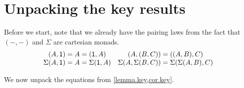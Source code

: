 \documentclass[11pt, one side, article]{memoir}
\theoremstyle{definition}
\theoremstyle{plain}
\newcommand{\Cat}[1]{\mathbf{#1}}%
\newcommand{\Fun}[1]{\mathit{#1}}%
\newcommand{\poly}{\Cat{Poly}}
\newcommand{\polycart}{\poly^{\Cat{Cart}}}
\newcommand{\0}{\textsf{0}}
\newcommand{\1}{\tn{\textsf{1}}}
\newcommand{\tri}{\mathbin{\triangleleft}}
\newcommand{\indep}{\Fun{Indep}}
\begin{document}
\section{Unpacking the key results}


Before we start, note that we already have the pairing laws from the fact that $(-,-)$ and $\Sigma$ are cartesian monads.
\[
\begin{array}{cc}
	(A,\1)=A=(\1,A)&(A,(B,C))=((A,B),C)\\
	\Sigma(A,\1)=A=\Sigma(\1,A)&
		\Sigma(A,\Sigma(B,C))=\Sigma(\Sigma(A,B),C)
\end{array}
\]

We now unpack the equations from \cref{lemma.key,cor.key}.




%		










\printbibliography
\end{document}
